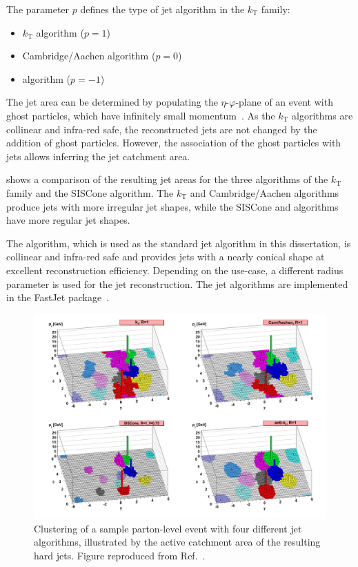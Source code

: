 The parameter \(p\) defines the type of jet algorithm in the \(k_{\text{T}}\) family:
\begin{itemize}
	\item \(k_{\text{T}}\) algorithm (\(p = 1\))~\cite{Catani1993,Ellis1993}
	\item Cambridge/Aachen algorithm (\(p = 0\))~\cite{Dokshitzer1997,}
	\item \Antikt algorithm (\(p = -1\))~\cite{Cacciari2008}
\end{itemize}

The jet area can be determined by populating the \(\eta\)-\(\varphi\)-plane of an event with ghost particles, which have infinitely small momentum~\cite{Cacciari2008-2}. As the \(k_{\text{T}}\) algorithms are collinear and infra-red safe, the reconstructed jets are not changed by the addition of ghost particles. However, the association of the ghost particles with jets allows inferring the jet catchment area.

 shows a comparison of the resulting jet areas for the three algorithms of the \(k_{\text{T}}\) family and the SISCone algorithm. The \(k_{\text{T}}\) and Cambridge/Aachen algorithms produce jets with more irregular jet shapes, while the SISCone and \antikt algorithms have more regular jet shapes.

The \antikt algorithm, which is used as the standard jet algorithm in this dissertation, is collinear and infra-red safe and provides jets with a nearly conical shape at excellent reconstruction efficiency. Depending on the use-case, a different radius parameter is used for the jet reconstruction. The jet algorithms are implemented in the FastJet package~\cite{Cacciari2012}.

\begin{figure}[htbp]
    \centering
    \includegraphics[width=.95\textwidth]{figures/protoncollisions/jetalgorithms.png}
    \caption{Clustering of a sample parton-level event with four different jet algorithms, illustrated by the active catchment area of the resulting hard jets. Figure reproduced from Ref.~\cite{Cacciari2008}.}
    \label{fig:pp:jets:algorithms}
\end{figure}
